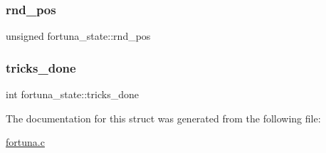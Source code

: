 \mbox{\label{structfortuna__state_a6b390be97975dff29c08c06ecf1bdb3a}} 
\subsubsection{\texorpdfstring{rnd\+\_\+pos}{rnd\_pos}}
{\footnotesize\ttfamily unsigned fortuna\+\_\+state\+::rnd\+\_\+pos}

\mbox{\label{structfortuna__state_a4ea7c5da5396b8f797f36993a98de5fe}} 
\subsubsection{\texorpdfstring{tricks\+\_\+done}{tricks\_done}}
{\footnotesize\ttfamily int fortuna\+\_\+state\+::tricks\+\_\+done}



The documentation for this struct was generated from the following file\+:\begin{DoxyCompactItemize}
\item 
\mbox{\hyperlink{fortuna_8c}{fortuna.\+c}}\end{DoxyCompactItemize}
